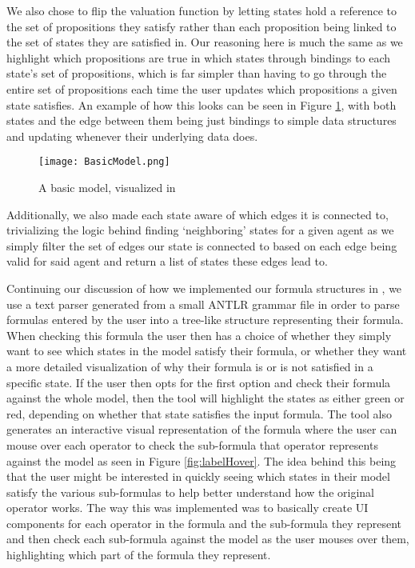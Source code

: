 We also chose to flip the valuation function by letting states hold a reference to the set of propositions they satisfy rather than each proposition being linked to the set of states they are satisfied in. Our reasoning here is much the same as we highlight which propositions are true in which states through bindings to each state's set of propositions, which is far simpler than having to go through the entire set of propositions each time the user updates which propositions a given state satisfies. An example of how this looks can be seen in Figure \ref{fig:basicModelVis}, with both states and the edge between them being just bindings to simple data structures and updating whenever their underlying data does.

\begin{figure}[H]
	\label{fig:basicModelVis}
	\caption{A basic model, visualized in \cname}
	\texttt{[image: BasicModel.png]}
\end{figure} 

Additionally, we also made each state aware of which edges it is connected to, trivializing the logic behind finding `neighboring' states for a given agent as we simply filter the set of edges our state is connected to based on each edge being valid for said agent and return a list of states these edges lead to.

Continuing our discussion of how we implemented our formula structures in \cname, we use a text parser generated from a small ANTLR grammar file in order to parse formulas entered by the user into a tree-like structure representing their formula. When checking this formula the user then has a choice of whether they simply want to see which states in the model satisfy their formula, or whether they want a more detailed visualization of why their formula is or is not satisfied in a specific state. If the user then opts for the first option and check their formula against the whole model, then the tool will highlight the states as either green or red, depending on whether that state satisfies the input formula. The tool also generates an interactive visual representation of the formula where the user can mouse over each operator to check the sub-formula that operator represents against the model as seen in Figure \ref{fig:labelHover}. The idea behind this being that the user might be interested in quickly seeing which states in their model satisfy the various sub-formulas to help better understand how the original operator works. The way this was implemented was to basically create UI components for each operator in the formula and the sub-formula they represent and then check each sub-formula against the model as the user mouses over them, highlighting which part of the formula they represent.

